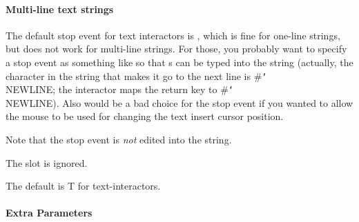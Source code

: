 \paragraph{Multi-line text strings}
The default stop event for text interactors is , which is fine
for one-line strings, but does not work for multi-line strings.  For those,
you probably want to specify a stop event as something like
 so
that s can be typed into the string (actually, the character
in the string that makes it go to the next line is \#{\tt\char`\\}NEWLINE; the
interactor maps the return key to \#{\tt\char`\\}NEWLINE).  Also 
would be a bad choice for the stop event if you wanted to allow the mouse
to be used for changing the text insert cursor position.

Note that the stop event is {\it not} edited into the string.

The  slot is ignored.

The default 
is T for text-interactors.

\paragraph{Extra Parameters}
\label{extra-text-parameters}

